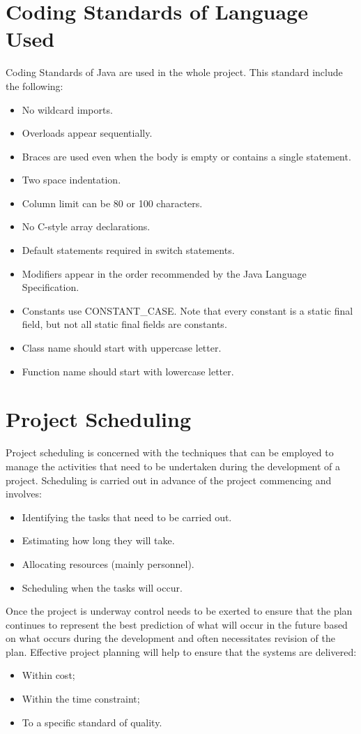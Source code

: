 \pagebreak
\section{Coding Standards of Language Used}
Coding Standards of Java are used in the whole project. This standard include the following:
\begin{itemize}
\item No wildcard imports.
\item Overloads appear sequentially.
\item Braces are used even when the body is empty or contains a single statement.
\item Two space indentation.
\item Column limit can be 80 or 100 characters.
\item No C-style array declarations.
\item Default statements required in switch statements.
\item Modifiers appear in the order recommended by the Java Language Specification.
\item Constants use CONSTANT\_CASE. Note that every constant is a static final field, but not all static final fields are constants.
\item Class name should start with uppercase letter.
\item Function name should start with lowercase letter.
\end{itemize}
\pagebreak
\section{Project Scheduling}
Project scheduling is concerned with the techniques that can be employed to manage the activities that need to be undertaken during the development of a project. Scheduling is carried out in advance of the project commencing and involves:
\begin{itemize}
\item Identifying the tasks that need to be carried out.
\item Estimating how long they will take.
\item Allocating resources (mainly personnel).
\item Scheduling when the tasks will occur.
\end{itemize}
Once the project is underway control needs to be exerted to ensure that the plan continues to represent the best prediction of what will occur in the future based on what occurs during the development and often necessitates revision of the plan.
Effective project planning will help to ensure that the systems are delivered:
\begin{itemize}
\item Within cost;
\item Within the time constraint;
\item To a specific standard of quality.
\end{itemize}

